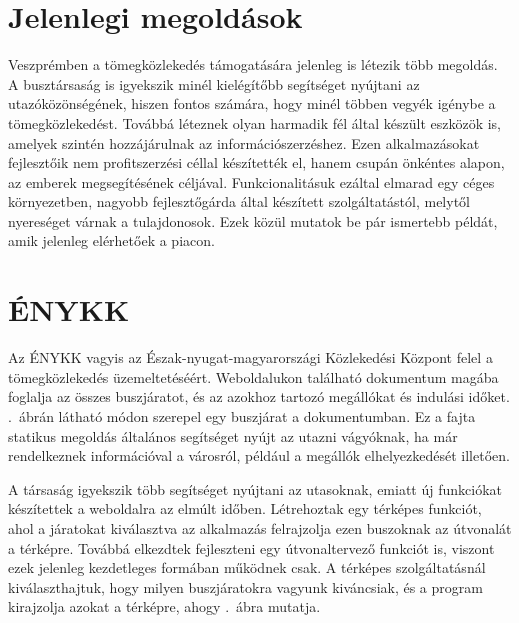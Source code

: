 \section{Jelenlegi megoldások}
\label{megoldasok}

Veszprémben a tömegközlekedés támogatására jelenleg is létezik több megoldás. 
A busztársaság is igyekszik minél kielégítőbb segítséget nyújtani az utazóközönségének, hiszen fontos számára, hogy minél többen vegyék igénybe a tömegközlekedést. 
Továbbá léteznek olyan harmadik fél által készült eszközök is, amelyek szintén hozzájárulnak az információszerzéshez. 
Ezen alkalmazásokat fejlesztőik nem profitszerzési céllal készítették el, hanem csupán önkéntes alapon, az emberek megsegítésének céljával.
Funkcionalitásuk ezáltal elmarad egy céges környezetben, nagyobb fejlesztőgárda által készített szolgáltatástól, melytől nyereséget várnak a tulajdonosok. 
Ezek közül mutatok be pár ismertebb példát, amik jelenleg elérhetőek a piacon. 



\section*{ÉNYKK}
\label{enykk}

Az ÉNYKK vagyis az Észak-nyugat-magyarországi Közlekedési Központ felel a tömegközlekedés üzemeltetéséért. 
Weboldalukon található dokumentum magába foglalja az összes buszjáratot, és az azokhoz tartozó megállókat és indulási időket. 
.\ ábrán látható módon szerepel egy buszjárat a dokumentumban. 
Ez a fajta statikus megoldás általános segítséget nyújt az utazni vágyóknak, ha már rendelkeznek információval a városról, például a megállók elhelyezkedését illetően. 


A társaság igyekszik több segítséget nyújtani az utasoknak, emiatt új funkciókat készítettek a weboldalra az elmúlt időben. 
Létrehoztak egy térképes funkciót, ahol a járatokat kiválasztva az alkalmazás felrajzolja ezen buszoknak az útvonalát a térképre. 
Továbbá elkezdtek fejleszteni egy útvonaltervező funkciót is, viszont ezek jelenleg kezdetleges formában működnek csak. 
A térképes szolgáltatásnál kiválaszthajtuk, hogy milyen buszjáratokra vagyunk kiváncsiak, és a program kirajzolja azokat a térképre, ahogy .\ ábra mutatja. 


